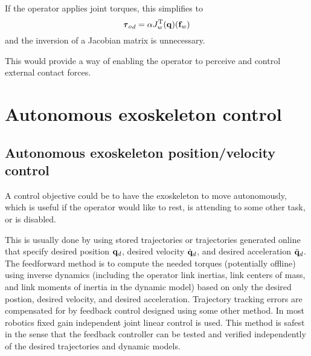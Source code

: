 \documentclass[letterpaper,12pt,fullpage]{article}
\begin{document}
If the operator applies joint torques, this simplifies to
\begin{equation}
{\vtau_o}_d = \alpha J_w^{\tr}(\vq) ( \vf_w )
\end{equation}
and the inversion of a Jacobian matrix is unnecessary.

This would provide a way of enabling the operator to perceive and control
external contact forces.

\section{Autonomous exoskeleton control}

\subsection{Autonomous exoskeleton position/velocity control}

A control objective could be to have the exoskeleton to move autonomously,
which is useful if the operator would like to rest, is attending to some other
task, or is disabled.

This is usually done by using stored trajectories or trajectories generated
online that specify desired position ${\bf q}_d$, 
desired velocity $\dot{{\bf q}}_d$, and
desired acceleration $\ddot{{\bf q}}_d$.
The feedforward method is to compute the needed torques (potentially offline)
using inverse
dynamics (including the operator link inertias, link centers of mass, and link
moments of inertia in the dynamic model) based on only the desired postion, 
desired velocity, and desired acceleration. Trajectory tracking errors are compensated
for by feedback control designed using some other method. In most robotics
fixed gain independent joint linear control is used.
This method is safest in the sense that the feedback controller can be tested
and verified independently of the desired trajectories and dynamic models.
\end{document}
